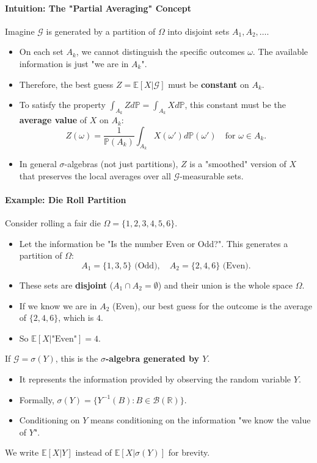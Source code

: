 \paragraph{Intuition: The "Partial Averaging" Concept}
Imagine $\mathcal{G}$ is generated by a partition of $\Omega$ into disjoint sets $A_1, A_2, \dots$.
\begin{itemize}
    \item On each set $A_k$, we cannot distinguish the specific outcomes $\omega$. The available information is just "we are in $A_k$".
    \item Therefore, the best guess $Z = \mathbb{E}[X|\mathcal{G}]$ must be \textbf{constant} on $A_k$.
    \item To satisfy the property $\int_{A_k} Z d\mathbb{P} = \int_{A_k} X d\mathbb{P}$, this constant must be the \textbf{average value} of $X$ on $A_k$:
    \[
    Z(\omega) = \frac{1}{\mathbb{P}(A_k)} \int_{A_k} X(\omega') d\mathbb{P}(\omega') \quad \text{for } \omega \in A_k.
    \]
    \item In general $\sigma$-algebras (not just partitions), $Z$ is a "smoothed" version of $X$ that preserves the local averages over all $\mathcal{G}$-measurable sets.
\end{itemize}

\paragraph{Example: Die Roll Partition}
Consider rolling a fair die $\Omega = \{1, 2, 3, 4, 5, 6\}$.
\begin{itemize}
    \item Let the information be "Is the number Even or Odd?". This generates a partition of $\Omega$:
    \[
    A_1 = \{1, 3, 5\} \text{ (Odd)}, \quad A_2 = \{2, 4, 6\} \text{ (Even)}.
    \]
    \item These sets are \textbf{disjoint} ($A_1 \cap A_2 = \emptyset$) and their union is the whole space $\Omega$.
    \item If we know we are in $A_2$ (Even), our best guess for the outcome is the average of $\{2, 4, 6\}$, which is $4$.
    \item So $\mathbb{E}[X | \text{"Even"}] = 4$.
\end{itemize}

\begin{remark}
If $\mathcal{G} = \sigma(Y)$, this is the \textbf{$\sigma$-algebra generated by $Y$}.
\begin{itemize}
    \item It represents the information provided by observing the random variable $Y$.
    \item Formally, $\sigma(Y) = \{ Y^{-1}(B) : B \in \mathcal{B}(\mathbb{R}) \}$.
    \item Conditioning on $Y$ means conditioning on the information "we know the value of $Y$".
\end{itemize}
We write $\mathbb{E}[X|Y]$ instead of $\mathbb{E}[X|\sigma(Y)]$ for brevity.
\end{remark}

